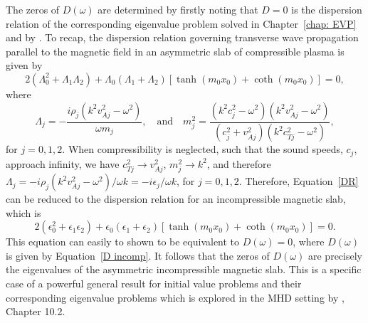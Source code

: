 \documentclass[12pt]{../style-files/ociamthesis}
\begin{document}
The zeros of $D(\omega)$ are determined by firstly noting that $D=0$ is the dispersion relation of the corresponding eigenvalue problem solved in Chapter~\ref{chap: EVP} and by \cite{zsa_etal18}. To recap, the dispersion relation governing transverse wave propagation parallel to the magnetic field in an asymmetric slab of compressible plasma is given by
\begin{equation}
2(\Lambda_0^2 + \Lambda_1 \Lambda_2) + \Lambda_0(\Lambda_1 + \Lambda_2)[\tanh(m_0x_0) + \coth(m_0x_0)] = 0,
\label{DR}
\end{equation}
where
\begin{equation}
\Lambda_j = -\frac{i\rho_j(k^2v_{Aj}^2 - \omega^2)}{\omega m_j},
\quad
\text{and}
\quad
m_j^2 = \frac{(k^2c_j^2 - \omega^2)(k^2v_{Aj}^2 - \omega^2)}{(c_j^2 + v_{Aj}^2)(k^2c_{Tj}^2 - \omega^2)},
\end{equation}
for $j = 0, 1, 2$. When compressibility is neglected, such that the sound speeds, $c_j$, approach infinity, we have $c_{Tj}^2 \to v_{Aj}^2$, $m_j^2 \to k^2$, and therefore $\Lambda_j = -i\rho_j(k^2v_{Aj}^2 - \omega^2)/\omega k = -i\epsilon_j / \omega k$, for $j=0,1,2$. Therefore, Equation~\eqref{DR} can be reduced to the dispersion relation for an incompressible magnetic slab, which is
\begin{equation}
2\left(\epsilon_0^2 + \epsilon_1 \epsilon_2\right) + \epsilon_0(\epsilon_1 + \epsilon_2)[\tanh(m_0x_0) + \coth(m_0x_0)] = 0.
\end{equation}
This equation can easily to shown to be equivalent to $D(\omega) = 0$, where $D(\omega)$ is given by Equation~\eqref{D incomp}. It follows that the zeros of $D(\omega)$ are precisely the eigenvalues of the asymmetric incompressible magnetic slab. This is a specific case of a powerful general result for initial value problems and their corresponding eigenvalue problems which is explored in the MHD setting by \cite{goe_etal04}, Chapter 10.2.
\end{document}
